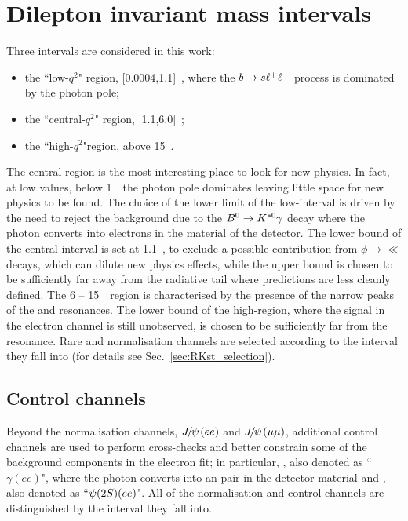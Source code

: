 \section{Dilepton invariant mass intervals}
\label{sec:RKst_q2_choice}

Three \qsq intervals are considered in this work: 
\begin{itemize}
\item the ``low-$q^2$" region, [0.0004,1.1]~\gevgevcccc, where the ${b}\rightarrow{\ensuremath{s}}\ell^+ \ell^-$ process is dominated by the photon pole;
\item the ``central-$q^2$" region, [1.1,6.0]~\gevgevcccc;
\item the ``high-$q^2$"region, above 15~\gevgevcccc.
\end{itemize}
%
The central-\qsq region is the most interesting place to look for new physics. In fact, at low \qsq values, below 
1~\gevgevcccc~the photon pole dominates leaving little space for new physics to be found. %
The choice of the lower limit of the low-\qsq interval is driven by the need to reject the background due to the 
${{B}^0}\rightarrow{\ensuremath{{K}^{*0}}}\gamma$ decay where the photon converts into electrons in the material of the detector.
The lower bound of the central interval is set at 1.1~\gevgevcccc, to exclude a possible contribution from $\phi\to\ll$ decays, 
which can dilute new physics effects, while the upper bound is chosen to be sufficiently far away from the \jpsi radiative
tail where predictions are less cleanly defined. The 6 -- 15~\gevgevcccc~region is characterised by the presence
of the narrow peaks of the \jpsi and \psitwos resonances. The lower bound of the high-\qsq region, where
the signal in the electron channel is still unobserved, is chosen to be sufficiently far from the \psitwos resonance.
Rare and normalisation channels are selected according to the \qsq interval they fall into (for details see Sec.~\ref{sec:RKst_selection}).

\subsection{Control channels}
Beyond the normalisation channels, $\jpsi(ee)$ and $\jpsi(\mu\mu)$, additional control channels
are used to perform cross-checks and better constrain some of the background components
in the electron fit; in particular, \BdToKstGee, also denoted as ``$\gamma (ee)$", where the photon 
converts into an \ee pair in the detector material and \BdToKstPsiee, also denoted as ``$\psitwos(ee)$".
All of the normalisation and control channels are distinguished by the \qsq interval
they fall into. %

